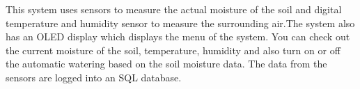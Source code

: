 This system uses sensors to measure the actual moisture of the soil and digital temperature and humidity sensor to measure the surrounding air.\+The system also has an OLED display which displays the menu of the system. You can check out the current moisture of the soil, temperature, humidity and also turn on or off the automatic watering based on the soil moisture data. The data from the sensors are logged into an SQL database. 